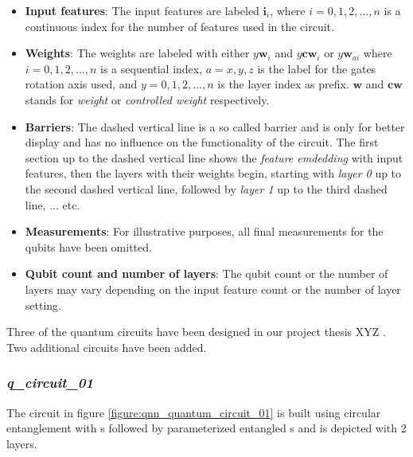 \begin{itemize}
  \item \textbf{Input features}: The input features are labeled $\mathbf{i}_i$, where $i = 0,1,2,...,n$ is a continuous index for the number of features used in the circuit.
  \item \textbf{Weights}: The weights are labeled with either $y\mathbf{w}_i$ and $y\mathbf{cw}_i$ or $y\mathbf{w}_{ai}$ where $i = 0,1,2,...,n$ is a sequential index, $a = x,y,z$ is the label for the gates rotation axis used, and $y = 0,1,2,...,n$ is the layer index as prefix. $\mathbf{w}$ and $\mathbf{cw}$ stands for \textit{weight} or \textit{controlled weight} respectively.
  \item \textbf{Barriers}: The dashed vertical line is a so called barrier and is only for better display and has no influence on the functionality of the circuit. The first section up to the dashed vertical line shows the \textit{feature emdedding} with input features, then the layers with their weights begin, starting with \textit{layer 0} up to the second dashed vertical line, followed by \textit{layer 1} up to the third dashed line, ... etc.
  \item \textbf{Measurements}: For illustrative purposes, all final measurements for the qubits have been omitted.
  \item \textbf{Qubit count and number of layers}: The qubit count or the number of layers may vary depending on the input feature count or the number of layer setting.
\end{itemize}

Three of the quantum circuits have been designed in our project thesis XYZ . Two additional circuits have been added.


\subsubsection{\textit{q\_circuit\_01}}
\label{subsubsection:qnn_quantum_circuit_01}
The circuit in figure \ref{figure:qnn_quantum_circuit_01} is built using circular entanglement with \rygate s followed by parameterized entangled \crygate s and is depicted with 2 layers. 

